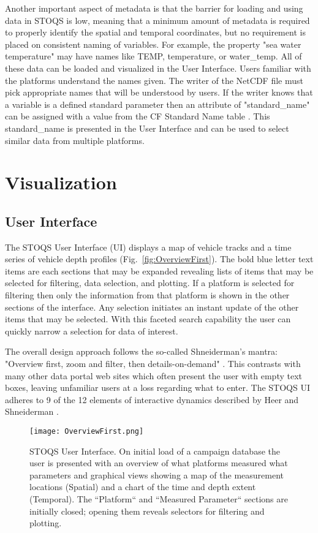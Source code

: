 \documentclass[conference]{IEEEtran}
\begin{document}
Another important aspect of metadata is that the barrier for loading and using data in 
STOQS is low, meaning that a minimum amount of metadata is required to properly 
identify the spatial and temporal coordinates, but no requirement is placed on 
consistent naming of variables. For example, the property "sea water temperature" may 
have names like TEMP, temperature, or water\_temp. All of these data can be loaded and 
visualized in the User Interface. Users familiar with the platforms understand the names 
given. The writer of the NetCDF file must pick appropriate names that will be understood 
by users. If the writer knows that a variable is a defined standard parameter then an 
attribute of "standard\_name" can be assigned with a value from the CF Standard Name 
table \cite{CFSN}. This standard\_name is presented in the User Interface and can be 
used to select similar data from multiple platforms.

\section{Visualization}

\subsection{User Interface}

The STOQS User Interface (UI) displays a map of vehicle tracks and a time series of 
vehicle depth profiles (Fig.~\ref{fig:OverviewFirst}). The bold blue letter text 
items are each sections that may be expanded revealing lists of items that may be 
selected for filtering, data selection, and plotting. If a platform is selected for 
filtering then only the information from that platform is shown in the other sections 
of the interface. Any selection initiates an instant update of the other items that 
may be selected. With this faceted search capability the user can quickly narrow a 
selection for data of interest. 

The overall design approach follows the so-called Shneiderman's mantra: "Overview first, 
zoom and filter, then details-on-demand" \cite{Whitney:2012:DIN:2597850}. This contrasts 
with many other data portal web sites which often present the user with empty text boxes, 
leaving unfamiliar users at a loss regarding what to enter. The STOQS UI adheres to 9 
of the 12 elements of interactive dynamics described by Heer and Shneiderman 
\cite{Heer:2012:IDV:2133416.2146416}.

\begin{figure*}[htbp]
\centering
\texttt{[image: OverviewFirst.png]}
\caption{STOQS User Interface. On initial load of a campaign database the user is presented 
with an overview of what platforms measured what parameters and graphical views showing 
a  map of the measurement locations (Spatial) and a chart of the time and depth extent (Temporal).
The ``Platform`` and ``Measured Parameter`` sections are initially closed; opening them 
reveals selectors for filtering and plotting.}
\label{fig:OverviewFirst.png}
\end{figure*}
\end{document}
